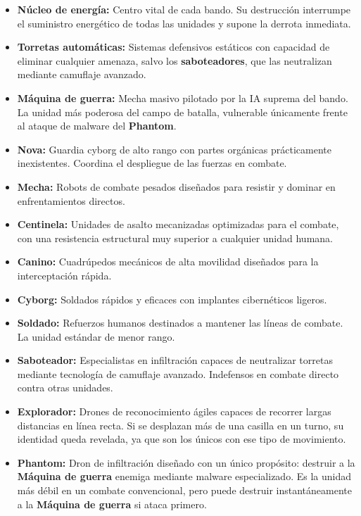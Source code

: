\begin{itemize}
	\item \textbf{Núcleo de energía:} Centro vital de cada bando. Su destrucción interrumpe el suministro energético de todas las unidades y supone la derrota inmediata.
	
	\item \textbf{Torretas automáticas:} Sistemas defensivos estáticos con capacidad de eliminar cualquier amenaza, salvo los \textbf{saboteadores}, que las neutralizan mediante camuflaje avanzado.
	
	\item \textbf{Máquina de guerra:} Mecha masivo pilotado por la IA suprema del bando. La unidad más poderosa del campo de batalla, vulnerable únicamente frente al ataque de malware del 
	\textbf{Phantom}.
	
	\item \textbf{Nova:} Guardia cyborg de alto rango con partes orgánicas prácticamente inexistentes. Coordina el despliegue de las fuerzas en combate.
	
	\item \textbf{Mecha:} Robots de combate pesados diseñados para resistir y dominar en enfrentamientos directos.
	
	\item \textbf{Centinela:} Unidades de asalto mecanizadas optimizadas para el combate, con una resistencia estructural muy superior a cualquier unidad humana.
	
	\item \textbf{Canino:} Cuadrúpedos mecánicos de alta movilidad diseñados para la interceptación rápida.
	
	\item \textbf{Cyborg:} Soldados rápidos y eficaces con implantes cibernéticos ligeros.
	
	\item \textbf{Soldado:} Refuerzos humanos destinados a mantener las líneas de combate. La unidad estándar de menor rango.
	
	\item \textbf{Saboteador:} Especialistas en infiltración capaces de neutralizar torretas mediante tecnología de camuflaje avanzado. Indefensos en combate directo contra otras unidades.
	
	\item \textbf{Explorador:} Drones de reconocimiento ágiles capaces de recorrer largas distancias en línea recta. Si se desplazan más de una casilla en un turno, su identidad queda revelada, ya que son los únicos con ese tipo de movimiento.
	
	\item \textbf{Phantom:} Dron de infiltración diseñado con un único propósito: destruir a la \textbf{Máquina de guerra} enemiga mediante malware especializado. Es la unidad más débil en un combate convencional, pero puede destruir instantáneamente a la \textbf{Máquina de guerra} si ataca primero.
\end{itemize}

